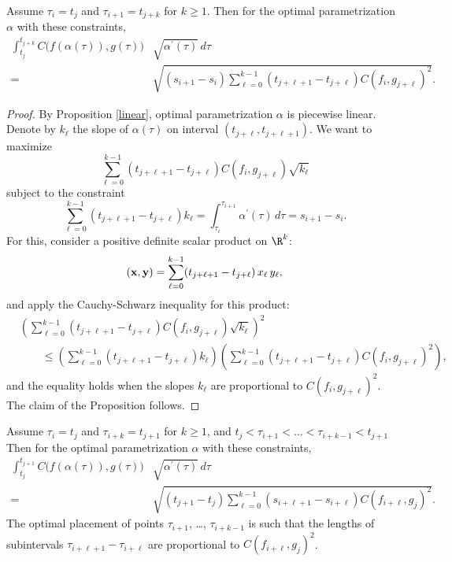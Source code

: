 \documentclass[12pt]{amsart}
\begin{document}
\begin{proposition}
\label{caseB}
Assume $\tau_i = t_j$ and $\tau_{i+1} = t_{j+k}$ for $k \geq 1$. Then for the optimal parametrization $\alpha$ with these constraints,
\begin{align*}
\int_{t_j}^{t_{j+k}}  C\big(f(\alpha(\tau)), g(\tau)\big) & \sqrt{\alpha^\prime(\tau)}  \,d\tau \\
= &\sqrt{(s_{i+1} - s_i) \sum_{\ell = 0}^{k-1} (t_{j+\ell+1} - t_{j+\ell}) C(f_i, g_{j+\ell})^2 }.
\end{align*}
\end{proposition}
\begin{proof}
By Proposition \ref{linear}, optimal parametrization $\alpha$ is piecewise linear. Denote by $k_\ell$ the slope of $\alpha(\tau)$ on interval $(t_{j+\ell}, t_{j+\ell+1})$. We want to maximize
\begin{equation*}
\sum_{\ell = 0}^{k-1} (t_{j+\ell+1} - t_{j+\ell}) C(f_i, g_{j+\ell}) \sqrt{k_\ell}
\end{equation*}
subject to the constraint
\begin{equation*}
\sum_{\ell = 0}^{k-1} (t_{j+\ell+1} - t_{j+\ell}) k_\ell = \int_{\tau_i}^{\tau_{i+1}} \alpha^\prime (\tau) \,d \tau = s_{i+1} - s_i.
\end{equation*}
For this, consider a positive definite scalar product on $\R^k$:
\begin{equation*}
({\bf x}, {\bf y}) = \sum_{\ell = 0}^{k-1} (t_{j+\ell+1} - t_{j+\ell}) \,x_\ell \,y_\ell,
\end{equation*}
and apply the Cauchy-Schwarz inequality for this product:
\begin{align*}
&\left( \sum_{\ell = 0}^{k-1}  (t_{j+\ell+1} - t_{j+\ell}) C(f_i, g_{j+\ell}) \sqrt{k_\ell} \right)^2 \\
&\quad\quad \leq \left( \sum_{\ell = 0}^{k-1} (t_{j+\ell+1} - t_{j+\ell}) k_\ell  \right) 
\left( \sum_{\ell = 0}^{k-1} (t_{j+\ell+1} - t_{j+\ell})  C(f_i, g_{j+\ell})^2 \right),
\end{align*}
and the equality holds when the slopes $k_\ell$ are proportional to $C(f_i, g_{j+\ell})^2$. The claim of the Proposition follows.
\end{proof}

\begin{proposition}
\label{caseA}
Assume $\tau_i = t_j$ and  $\tau_{i+k} = t_{j+1}$ for $k \geq 1$, and 
$t_j < \tau_{i+1} < \ldots < \tau_{i+k-1} < t_{j+1}$ Then for the optimal parametrization $\alpha$ with these constraints,
\begin{align*}
\int_{t_j}^{t_{j+1}}  C\big(f(\alpha(\tau)), g(\tau)\big) & \sqrt{\alpha^\prime(\tau)}  \,d\tau \\
= &\sqrt{(t_{j+1} - t_j) \sum_{\ell = 0}^{k-1} (s_{i+\ell+1} - s_{i+\ell}) C(f_{i + \ell}, g_j)^2 }.
\end{align*}
The optimal placement of points $\tau_{i+1}$, \ldots, $\tau_{i+k-1}$ is such that the lengths of subintervals
$\tau_{i+\ell+1} - \tau_{i+\ell}$ are proportional to $C(f_{i + \ell}, g_j)^2$.
\end{proposition}
\end{document}
